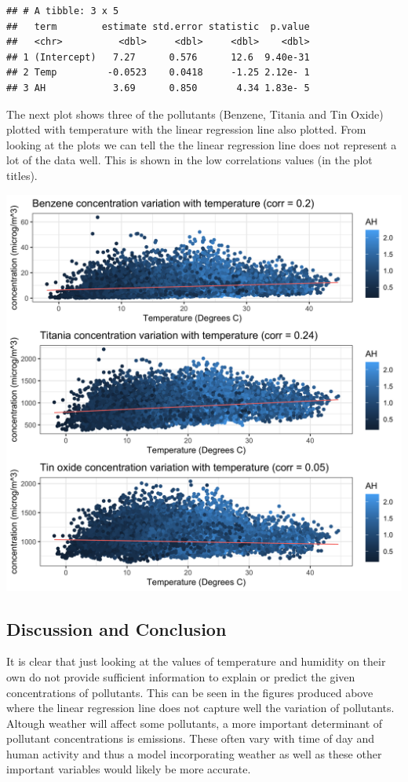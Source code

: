 \documentclass[]{article}
\begin{document}
\begin{verbatim}
## # A tibble: 3 x 5
##   term        estimate std.error statistic  p.value
##   <chr>          <dbl>     <dbl>     <dbl>    <dbl>
## 1 (Intercept)   7.27      0.576      12.6  9.40e-31
## 2 Temp         -0.0523    0.0418     -1.25 2.12e- 1
## 3 AH            3.69      0.850       4.34 1.83e- 5
\end{verbatim}

The next plot shows three of the pollutants (Benzene, Titania and Tin
Oxide) plotted with temperature with the linear regression line also
plotted. From looking at the plots we can tell the the linear regression
line does not represent a lot of the data well. This is shown in the low
correlations values (in the plot titles).

\includegraphics{../Images/more_lr_plots.png}

\hypertarget{discussion-and-conclusion}{%
\subsection{Discussion and Conclusion}\label{discussion-and-conclusion}}

It is clear that just looking at the values of temperature and humidity
on their own do not provide sufficient information to explain or predict
the given concentrations of pollutants. This can be seen in the figures
produced above where the linear regression line does not capture well
the variation of pollutants. Altough weather will affect some
pollutants, a more important determinant of pollutant concentrations is
emissions. These often vary with time of day and human activity and thus
a model incorporating weather as well as these other important variables
would likely be more accurate.
\end{document}
